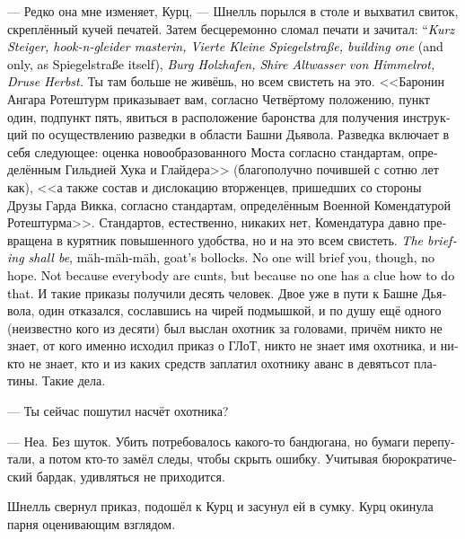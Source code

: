 \documentclass[a4paper,12pt,fleqn]{book}\usepackage{cooltooltips}\usepackage{polyglossia}\setdefaultlanguage[babelshorthands=true]{russian}\setotherlanguage{english}\defaultfontfeatures{Ligatures=TeX,Mapping=tex-text} \usepackage{xcolor}\definecolor{lightgray}{HTML}{bbbbbb}\color{lightgray}\newcommand{\ml}[3]{\textenglish{\textcolor{black}{#3}}}
\begin{document}
--- Редко она мне изменяет, Курц, --- Шнелль порылся в столе и выхватил свиток, скреплённый кучей печатей.
Затем бесцеремонно сломал печати и зачитал:
\ml{$0$}
{--- <<Курц Штайгер, мастер хука и глайдера, адрес проживания Фирте Кляйне Шпигельштрассе, дом первый>> (и единственный, как и сама Шпигельштрассе), <<бург Хольцхафен, земля Альтвассер фон Химмельрот, Друза Хербст>>.}
{``\textit{Kurz Steiger, hook-n-gleider masterin, Vierte Kleine Spiegelstraße, building one} (and only, as Spiegelstraße itself), \textit{Burg Holzhafen, Shire Altwasser von Himmelrot, Druse Herbst.}}
Ты там больше не живёшь, но всем свистеть на это.
<<Баронин Ангара Ротештурм приказывает вам, согласно Четвёртому положению, пункт один, подпункт пять, явиться в расположение баронства для получения инструкций по осуществлению разведки в области Башни Дьявола.
Разведка включает в себя следующее: оценка новообразованного Моста согласно стандартам, определённым Гильдией Хука и Глайдера>> (благополучно почившей с сотню лет как), <<а также состав и дислокацию вторженцев, пришедших со стороны Друзы Гарда Викка, согласно стандартам, определённым Военной Комендатурой Ротештурма>>.
Стандартов, естественно, никаких нет, Комендатура давно превращена в курятник повышенного удобства, но и на это всем свистеть.
\ml{$0$}
{<<Инструктаж должен быть осуществлён>>, мя-мя-мя, козьи яйца.}
{\textit{The briefing shall be}, mäh-mäh-mäh, goat's bollocks.}
\ml{$0$}
{Инструктировать тебя никто не будет, даже не надейся.}
{No one will brief you, though, no hope.}
\ml{$0$}
{Не потому что все такие вредные, а потому что никто понятия не имеет, как тебя инструктировать.}
{Not because everybody are cunts, but because no one has a clue how to do that.}
И такие приказы получили десять человек.
Двое уже в пути к Башне Дьявола, один отказался, сославшись на чирей подмышкой, и по душу ещё одного (неизвестно кого из десяти) был выслан охотник за головами, причём никто не знает, от кого именно исходил приказ о ГЛоТ, никто не знает имя охотника, и никто не знает, кто и из каких средств заплатил охотнику аванс в девятьсот платины.
Такие дела.

--- Ты сейчас пошутил насчёт охотника?

--- Неа.
Без шуток.
Убить потребовалось какого-то бандюгана, но бумаги перепутали, а потом кто-то замёл следы, чтобы скрыть ошибку.
Учитывая бюрократический бардак, удивляться не приходится.

Шнелль свернул приказ, подошёл к Курц и засунул ей в сумку.
Курц окинула парня оценивающим взглядом.
\end{document}
